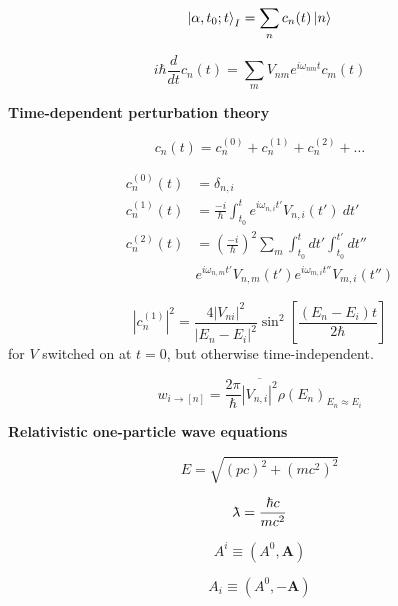 \documentclass[11pt]{article}
\newcommand{\vect}[1]{\boldsymbol{\mathbf{#1}}}
\newcommand{\lambdabar}{{\mkern0.75mu\mathchar '26\mkern -9.75mu\lambda}}
\begin{document}
\begin{multicols}{2}
\begin{equation} %
\ket{\alpha,t_0;t}_I = \sum_n c_n(t) \ket{n}
\end{equation}

\begin{equation} %
i\hbar \frac{d}{dt} c_n(t)  = \sum_m V_{nm} e^{i\omega_{nm}t}c_m(t)
\end{equation}

{\bf Time-dependent perturbation theory}

\begin{equation}
c_n(t) = c_n^{(0)} + c_n^{(1)} + c_n^{(2)} + \dots
\end{equation}

\begin{align}
c_n^{(0)}(t) & = \delta_{n,i} \\
c_n^{(1)}(t) & = \frac{-i}{\hbar} 
  \int_{t_0}^t e^{i\omega_{n,i}t'} V_{n,i}(t') \: dt' \\
c_n^{(2)}(t) & = \left( \frac{-i}{\hbar} \right)^2
\sum_m \int_{t_0}^{t} dt' \int_{t_0}^{t'} dt''  \nonumber \\
&
e^{i\omega_{n,m}t'} V_{n,m}(t') e^{i\omega_{m,i}t''} V_{m,i}(t'')
\end{align}


\begin{equation}
|c_n^{(1)}|^2 =
  \frac{4|V_{ni}|^2}{|E_n-E_i|^2} \sin^2 
    \left [
      \frac{(E_n-E_i)t}{2\hbar}
    \right ]
\end{equation}
{\footnotesize for $V$ switched on at $t=0$, but otherwise time-independent.}

\begin{equation}
w_{i\rightarrow [n]} =
\frac{2\pi}{\hbar} \overline{|V_{n,i}|^2} \rho(E_n)_{E_n \approx E_i}
\end{equation}

{\bf Relativistic one-particle wave equations}

\begin{equation}
E = \sqrt{(pc)^2+(mc^2)^2}
\end{equation} 

\begin{equation}
\lambdabar = \frac{\hbar c}{mc^2}
\end{equation}

\begin{equation}
A^i \equiv (A^0, \vect{A})
\end{equation}

\begin{equation}
A_i \equiv (A^0, -\vect{A})
\end{equation}


\end{multicols}
\end{document}
